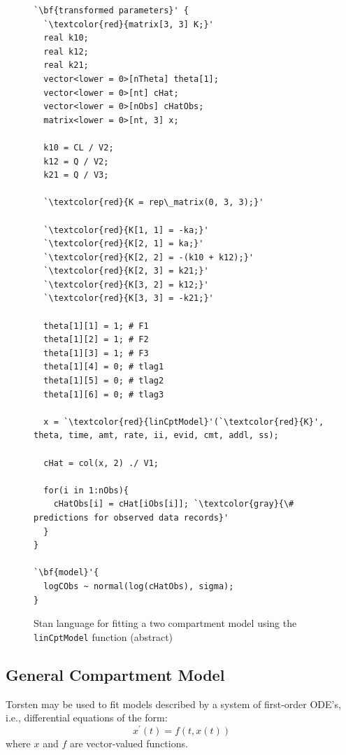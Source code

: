 \documentclass[11pt]{amsart}
\newenvironment{fmpage}[1]
     {\begin{lrbox}{\fmbox}\begin{minipage}{#1}}
     {\end{minipage}\end{lrbox}\fbox{\usebox{\fmbox}}}
\begin{document}
\begin{figure}
\caption{Stan language for fitting a two compartment model using the \texttt{linCptModel} function (abstract)}
\begin{center}
\begin{small}
\begin{fmpage}{\textwidth - .75in}
\begin{lstlisting}[basicstyle=\footnotesize\ttfamily,mathescape=true,flexiblecolumns=true,frame=single,escapeinside=`']
`\bf{transformed parameters}' {
  `\textcolor{red}{matrix[3, 3] K;}'
  real k10;
  real k12;
  real k21;
  vector<lower = 0>[nTheta] theta[1];
  vector<lower = 0>[nt] cHat;
  vector<lower = 0>[nObs] cHatObs;
  matrix<lower = 0>[nt, 3] x;
  
  k10 = CL / V2;
  k12 = Q / V2;
  k21 = Q / V3;
 
  `\textcolor{red}{K = rep\_matrix(0, 3, 3);}'

  `\textcolor{red}{K[1, 1] = -ka;}'  
  `\textcolor{red}{K[2, 1] = ka;}' 
  `\textcolor{red}{K[2, 2] = -(k10 + k12);}' 
  `\textcolor{red}{K[2, 3] = k21;}' 
  `\textcolor{red}{K[3, 2] = k12;}' 
  `\textcolor{red}{K[3, 3] = -k21;}'

  theta[1][1] = 1; # F1
  theta[1][2] = 1; # F2
  theta[1][3] = 1; # F3
  theta[1][4] = 0; # tlag1
  theta[1][5] = 0; # tlag2
  theta[1][6] = 0; # tlag3

  x = `\textcolor{red}{linCptModel}'(`\textcolor{red}{K}', theta, time, amt, rate, ii, evid, cmt, addl, ss);

  cHat = col(x, 2) ./ V1;

  for(i in 1:nObs){
    cHatObs[i] = cHat[iObs[i]]; `\textcolor{gray}{\# predictions for observed data records}'
  }
}

`\bf{model}'{
  logCObs ~ normal(log(cHatObs), sigma);
}
\end{lstlisting}
\end{fmpage}
\end{small}
\end{center}
\label{example1.1Model}
\end{figure}

\subsection*{General Compartment Model}

Torsten may be used to fit models described by a system of first-order ODE's, i.e., differential equations of the form:
$$ x^\prime\left(t\right) = f\left(t, x\left(t\right)\right) $$
where $x$ and $f$ are vector-valued functions.
\end{document}
